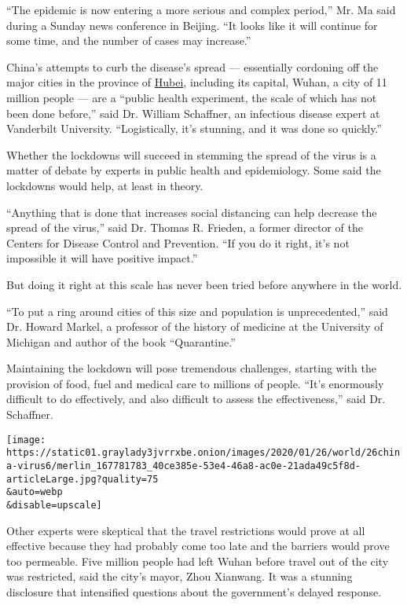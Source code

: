 ``The epidemic is now entering a more serious and complex period,'' Mr.
Ma said during a Sunday news conference in Beijing. ``It looks like it
will continue for some time, and the number of cases may increase.''

China's attempts to curb the disease's spread --- essentially cordoning
off the major cities in the province of
\href{https://www.nytimes3xbfgragh.onion/2020/07/03/world/asia/china-floods-rain.html}{Hubei},
including its capital, Wuhan, a city of 11 million people --- are a
``public health experiment, the scale of which has not been done
before,'' said Dr. William Schaffner, an infectious disease expert at
Vanderbilt University. ``Logistically, it's stunning, and it was done so
quickly.''

Whether the lockdowns will succeed in stemming the spread of the virus
is a matter of debate by experts in public health and epidemiology. Some
said the lockdowns would help, at least in theory.

``Anything that is done that increases social distancing can help
decrease the spread of the virus,'' said Dr. Thomas R. Frieden, a former
director of the Centers for Disease Control and Prevention. ``If you do
it right, it's not impossible it will have positive impact.''

But doing it right at this scale has never been tried before anywhere in
the world.

``To put a ring around cities of this size and population is
unprecedented,'' said Dr. Howard Markel, a professor of the history of
medicine at the University of Michigan and author of the book
``Quarantine.''

Maintaining the lockdown will pose tremendous challenges, starting with
the provision of food, fuel and medical care to millions of people.
``It's enormously difficult to do effectively, and also difficult to
assess the effectiveness,'' said Dr. Schaffner.

\texttt{[image: https://static01.graylady3jvrrxbe.onion/images/2020/01/26/world/26china-virus6/merlin\_167781783\_40ce385e-53e4-46a8-ac0e-21ada49c5f8d-articleLarge.jpg?quality=75\\\&auto=webp\\\&disable=upscale]}

Other experts were skeptical that the travel restrictions would prove at
all effective because they had probably come too late and the barriers
would prove too permeable. Five million people had left Wuhan before
travel out of the city was restricted, said the city's mayor, Zhou
Xianwang. It was a stunning disclosure that intensified questions about
the government's delayed response.

